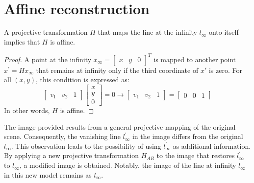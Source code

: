 \documentclass[12pt, a4paper]{report}
\begin{document}
    \section{Affine reconstruction}
    \begin{theorem}
        A projective transformation $H$ that maps the line at the infinity $l_{\infty}$ onto itself implies that $H$ is affine. 
    \end{theorem}
    \begin{proof}
        A point at the infinity $x_{\infty}={\begin{bmatrix} x & y & 0 \end{bmatrix}^T}$ is mapped to another point $x^{'}=Hx_{\infty}$ that remains at infinity only if the third coordinate of $x'$ is zero.
        For all $(x,y)$, this condition is expressed as:
        \[\begin{bmatrix} v_1 & v_2 & 1 \end{bmatrix} \begin{bmatrix} x \\ y \\ 0 \end{bmatrix}=0 \rightarrow \begin{bmatrix} v_1 & v_2 & 1 \end{bmatrix} = \begin{bmatrix} 0 & 0 & 1 \end{bmatrix}\]
        In other words, $H$ is affine.
    \end{proof}
    The image provided results from a general projective mapping of the original scene. 
    Consequently, the vanishing line $l^{'}_{\infty}$ in the image differs from the original $l_{\infty}$. 
    This observation leads to the possibility of using $l^{'}_{\infty}$ as additional information.
    By applying a new projective transformation $H_{AR}$ to the image that restores $l^{'}_{\infty}$ to $l_{\infty}$, a modified image is obtained.
    Notably, the image of the line at infinity $l_{\infty}$ in this new model remains as $l_{\infty}$. 
\end{document}
